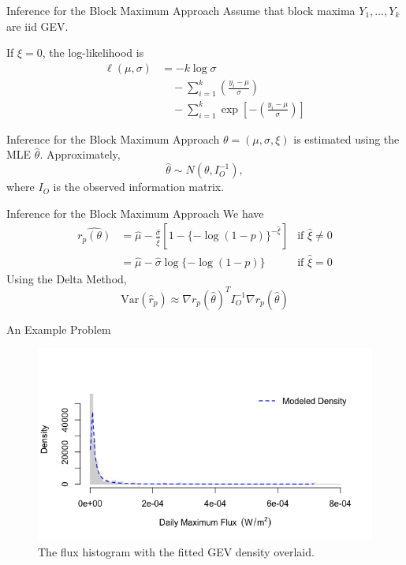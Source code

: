 \documentclass{beamer}
\begin{document}
\begin{frame}{Inference for the Block Maximum Approach}
    Assume that block maxima $Y_1, \ldots, Y_k$ are iid GEV.

    \medskip
    
    If $\xi = 0$, the log-likelihood is
    \begin{align*}
        \ell(\mu, \sigma) &= -k\log\sigma \\
        &\quad - \sum_{i = 1}^k \left(\frac{y_i - \mu}{\sigma}\right) \\
        &\quad - \sum_{i = 1}^k \exp\left[-\left(\frac{y_i - \mu}{\sigma}\right)\right]
    \end{align*}
\end{frame}

\begin{frame}{Inference for the Block Maximum Approach}
    $\theta = (\mu, \sigma, \xi)$ is estimated using the MLE $\hat{\theta}$. Approximately,
    \[
    \hat{\theta} \sim N(\theta, I_O^{-1}),
    \]
    where $I_O$ is the observed information matrix.
\end{frame}

\begin{frame}{Inference for the Block Maximum Approach}
    We have
    \begin{align*}
        \widehat{r_p(\theta)} &= \hat{\mu} - \frac{\hat{\sigma}}{\hat{\xi}}[1 - \{-\log(1 - p)\}^{-\hat{\xi}}] & \text{if $\hat{\xi} \ne 0$} \\
        &= \hat{\mu} - \hat{\sigma}\log\{-\log(1 - p)\} & \text{if $\hat{\xi} = 0$}
    \end{align*}
    Using the Delta Method,
    \[
    \text{Var}(\hat{r}_p) \approx \nabla r_p(\hat{\theta})^T I_O^{-1}\nabla r_p(\hat{\theta})
    \]
\end{frame}

\begin{frame}{An Example Problem}
    \begin{figure}
        \centering
        \includegraphics[scale=0.5]{daily_max_flux_hist2.png}
        \caption{The flux histogram with the fitted GEV density overlaid.}
        \label{fig:daily_max_flux_hist2}
    \end{figure}
\end{frame}
\end{document}
